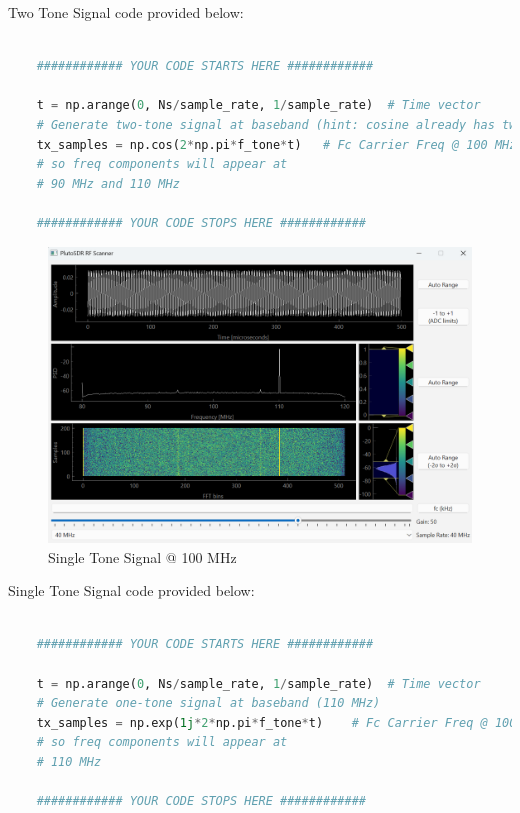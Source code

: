 \documentclass[
	letterpaper, %
	10pt, %
]{CSUniSchoolLabReport}
\begin{document}
Two Tone Signal code provided below:
\begin{lstlisting}[language=Python]
	
	############ YOUR CODE STARTS HERE ############
	
	t = np.arange(0, Ns/sample_rate, 1/sample_rate)  # Time vector
	# Generate two-tone signal at baseband (hint: cosine already has two tones at f_tone and -f_tone)
	tx_samples = np.cos(2*np.pi*f_tone*t)   # Fc Carrier Freq @ 100 MHz, 
	# so freq components will appear at
	# 90 MHz and 110 MHz
	
	############ YOUR CODE STOPS HERE ############

\end{lstlisting}

\begin{figure}[H] %
	\centering %
	\includegraphics[width=1.2\textwidth]{assignment2b.png} %
	\caption{Single Tone Signal @ 100 MHz}
	\label{fig:block}
\end{figure}

Single Tone Signal code provided below:
\begin{lstlisting}[language=Python]
	
	############ YOUR CODE STARTS HERE ############
	
	t = np.arange(0, Ns/sample_rate, 1/sample_rate)  # Time vector
	# Generate one-tone signal at baseband (110 MHz)
	tx_samples = np.exp(1j*2*np.pi*f_tone*t)    # Fc Carrier Freq @ 100 MHz, 
	# so freq components will appear at
	# 110 MHz
	
	############ YOUR CODE STOPS HERE ############
	
\end{lstlisting}
\end{document}

